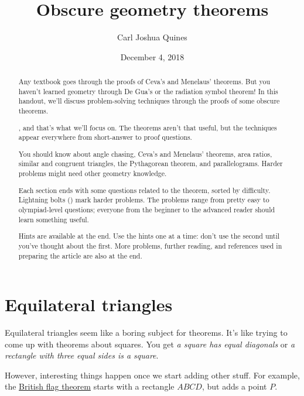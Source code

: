 \documentclass[11pt,paper=letter]{scrartcl}
\let\faBoltOld\faBolt
\renewcommand{\faBolt}{{\relsize{-1}\faBoltOld}}
\begin{document}
\title{Obscure geometry theorems}
\author{Carl Joshua Quines}
\date{December 4, 2018}

\maketitle

\begin{abstract}

Any textbook goes through the proofs of Ceva's and Menelaus' theorems. But you haven't learned geometry through De Gua's or the radiation symbol theorem! In this handout, we'll discuss problem-solving techniques through the proofs of some obscure theorems.

, and that's what we'll focus on. The theorems aren't that useful, but the techniques appear everywhere from short-answer to proof questions.

You should know about angle chasing, Ceva's and Menelaus' theorems, area ratios, similar and congruent triangles, the Pythagorean theorem, and parallelograms. Harder problems might need other geometry knowledge.

Each section ends with some questions related to the theorem, sorted by difficulty. Lightning bolts (\faBolt) mark harder problems. The problems range from pretty easy to olympiad-level questions; everyone from the beginner to the advanced reader should learn something useful.

Hints are available at the end. Use the hints one at a time: don't use the second until you've thought about the first. More problems, further reading, and references used in preparing the article are also at the end.

\end{abstract}

\section{Equilateral triangles}

Equilateral triangles seem like a boring subject for theorems. It's like trying to come up with theorems about squares. You get \emph{a square has equal diagonals} or \emph{a rectangle with three equal sides is a square}.

However, interesting things happen once we start adding other stuff. For example, the \href{https://en.wikipedia.org/wiki/British_flag_theorem}{British flag theorem} starts with a rectangle $ABCD$, but adds a point $P$.
\end{document}
